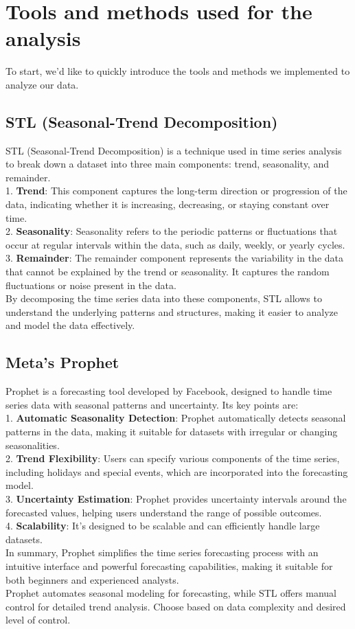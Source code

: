 \section{Tools and methods used for the analysis}
\noindent
To start, we'd like to quickly introduce the tools and methods we implemented to analyze our data.

\vspace{-15pt}

\subsection{STL (Seasonal-Trend Decomposition)}
STL (Seasonal-Trend Decomposition) is a technique used in time series analysis to break down a dataset into three main components: trend, seasonality, and remainder. \\
1. \textbf{Trend}: This component captures the long-term direction or progression of the data, indicating whether it is increasing, decreasing, or staying constant over time. \\
2. \textbf{Seasonality}: Seasonality refers to the periodic patterns or fluctuations that occur at regular intervals within the data, such as daily, weekly, or yearly cycles. \\
3. \textbf{Remainder}: The remainder component represents the variability in the data that cannot be explained by the trend or seasonality. It captures the random fluctuations or noise present in the data. \\
By decomposing the time series data into these components, STL allows to understand the underlying patterns and structures, making it easier to analyze and model the data effectively.

\vspace{-15pt}

\subsection{Meta's Prophet}
Prophet is a forecasting tool developed by Facebook, designed to handle time series data with seasonal patterns and uncertainty. Its key points are: \\
1. \textbf{Automatic Seasonality Detection}: Prophet automatically detects seasonal patterns in the data, making it suitable for datasets with irregular or changing seasonalities. \\
2. \textbf{Trend Flexibility}: Users can specify various components of the time series, including holidays and special events, which are incorporated into the forecasting model. \\
3. \textbf{Uncertainty Estimation}: Prophet provides uncertainty intervals around the forecasted values, helping users understand the range of possible outcomes. \\
4. \textbf{Scalability}: It's designed to be scalable and can efficiently handle large datasets. \\
In summary, Prophet simplifies the time series forecasting process with an intuitive interface and powerful forecasting capabilities, making it suitable for both beginners and experienced analysts. \\

Prophet automates seasonal modeling for forecasting, while STL offers manual control for detailed trend analysis. Choose based on data complexity and desired level of control.

